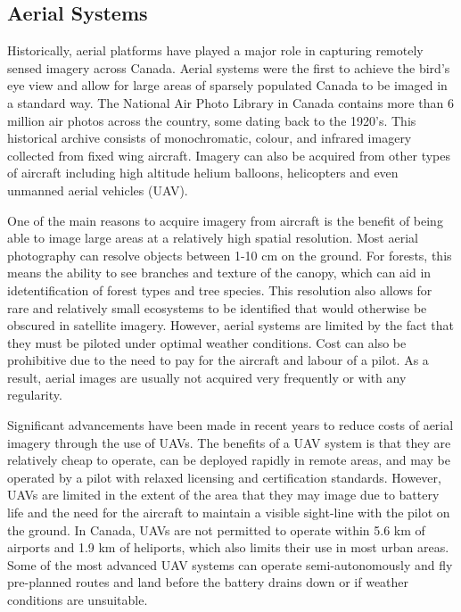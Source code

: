 \documentclass[
]{book}
\begin{document}
\subsection{Aerial Systems}\label{aerial-systems}

Historically, aerial platforms have played a major role in capturing remotely sensed imagery across Canada. Aerial systems were the first to achieve the bird's eye view and allow for large areas of sparsely populated Canada to be imaged in a standard way. The National Air Photo Library in Canada contains more than 6 million air photos across the country, some dating back to the 1920's. This historical archive consists of monochromatic, colour, and infrared imagery collected from fixed wing aircraft. Imagery can also be acquired from other types of aircraft including high altitude helium balloons, helicopters and even unmanned aerial vehicles (UAV).

One of the main reasons to acquire imagery from aircraft is the benefit of being able to image large areas at a relatively high spatial resolution. Most aerial photography can resolve objects between 1-10 cm on the ground. For forests, this means the ability to see branches and texture of the canopy, which can aid in idetentification of forest types and tree species. This resolution also allows for rare and relatively small ecosystems to be identified that would otherwise be obscured in satellite imagery. However, aerial systems are limited by the fact that they must be piloted under optimal weather conditions. Cost can also be prohibitive due to the need to pay for the aircraft and labour of a pilot. As a result, aerial images are usually not acquired very frequently or with any regularity.

Significant advancements have been made in recent years to reduce costs of aerial imagery through the use of UAVs. The benefits of a UAV system is that they are relatively cheap to operate, can be deployed rapidly in remote areas, and may be operated by a pilot with relaxed licensing and certification standards. However, UAVs are limited in the extent of the area that they may image due to battery life and the need for the aircraft to maintain a visible sight-line with the pilot on the ground. In Canada, UAVs are not permitted to operate within 5.6 km of airports and 1.9 km of heliports, which also limits their use in most urban areas. Some of the most advanced UAV systems can operate semi-autonomously and fly pre-planned routes and land before the battery drains down or if weather conditions are unsuitable.
\end{document}
